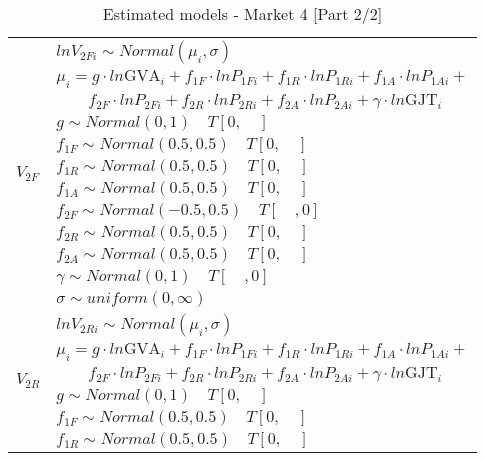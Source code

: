 
\begin{table}[!ht] \centering 
  \caption{Estimated models - Market 4 [Part 2/2]} 
  \label{tbl:models_statement_mkt4_2} 
{\renewcommand\arraystretch{1.25}}
\begin{tabular} {ll}
\toprule
\multirow{12}{*}{$V_{2F}$} &$lnV_{2Fi} \sim Normal(\mu_i, \sigma) $ \\
                          &$\mu_i = g \cdot ln \text{GVA}_i + f_{1F} \cdot lnP_{1Fi} + f_{1R} \cdot lnP_{1Ri} + f_{1A} \cdot lnP_{1Ai} +$\\
                          &$\quad \quad f_{2F} \cdot lnP_{2Fi} + f_{2R} \cdot lnP_{2Ri} + f_{2A} \cdot lnP_{2Ai} + \gamma \cdot ln\text{GJT}_i$ \\
                          &$g \sim Normal (0,1) \quad T[0,\quad]$\\
                          &$f_{1F} \sim Normal (0.5,0.5) \quad T[0,\quad]$\\
                          &$f_{1R} \sim Normal (0.5,0.5) \quad T[0,\quad]$\\
                          &$f_{1A} \sim Normal (0.5,0.5) \quad T[0,\quad]$\\
                          &$f_{2F} \sim Normal (-0.5,0.5) \quad T[\quad,0]$\\
                          &$f_{2R} \sim Normal (0.5,0.5) \quad T[0,\quad]$\\
                          &$f_{2A} \sim Normal (0.5,0.5) \quad T[0,\quad]$\\
                          &$\gamma \sim Normal (0,1)  \quad T[\quad,0]$\\
                          &$\sigma \sim uniform(0,\infty) $\\ 
\hline
\multirow{12}{*}{$V_{2R}$} &$lnV_{2Ri} \sim Normal(\mu_i, \sigma) $ \\
                          &$\mu_i = g \cdot ln \text{GVA}_i + f_{1F} \cdot lnP_{1Fi} + f_{1R} \cdot lnP_{1Ri} + f_{1A} \cdot lnP_{1Ai} +$\\
                          &$\quad \quad f_{2F} \cdot lnP_{2Fi} + f_{2R} \cdot lnP_{2Ri} + f_{2A} \cdot lnP_{2Ai} + \gamma \cdot ln\text{GJT}_i$ \\
                          &$g \sim Normal (0,1) \quad T[0,\quad]$\\
                          &$f_{1F} \sim Normal (0.5,0.5) \quad T[0,\quad]$\\
                          &$f_{1R} \sim Normal (0.5,0.5) \quad T[0,\quad]$\\

\end{tabular}
\end{table}
